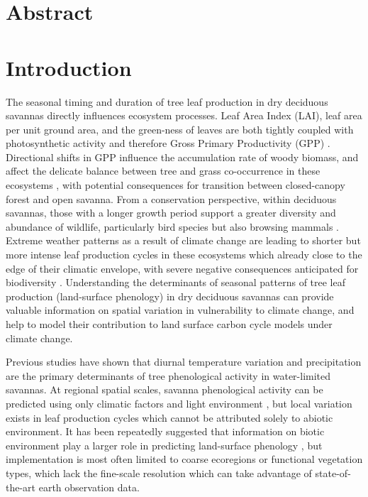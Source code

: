 \documentclass[11pt,a4paper]{article}
\begin{document}
\section*{Abstract}

\section{Introduction}

The seasonal timing and duration of tree leaf production in dry deciduous
savannas directly influences ecosystem processes. Leaf Area Index (LAI), leaf
area per unit ground area, and the green-ness of leaves are both tightly
coupled with photosynthetic activity and therefore Gross Primary Productivity
(GPP) \citep{Gu2003, Penuelas2009}. Directional shifts in GPP influence the
accumulation rate of woody biomass, and affect the delicate balance between
tree and grass co-occurrence in these ecosystems \citep{Stevens2016}, with
potential consequences for transition between closed-canopy forest and open
savanna. From a conservation perspective, within deciduous savannas, those with
a longer growth period support a greater diversity and abundance of wildlife,
particularly bird species but also browsing mammals \citep{Cole2015, Araujo2017,
Morellato2016, Ogutu2013}. Extreme weather patterns as a result of climate
change are leading to shorter but more intense leaf production cycles in these
ecosystems which already close to the edge of their climatic envelope, with severe negative consequences anticipated for biodiversity \citep{Bale2002}. Understanding the determinants of seasonal patterns of tree leaf production (land-surface phenology) in dry deciduous savannas can provide valuable information on spatial variation in vulnerability to climate change, and help to model their contribution to land surface carbon cycle models under climate change.

Previous studies have shown that diurnal temperature variation and precipitation are the primary determinants of tree phenological activity in water-limited savannas. At regional spatial scales, savanna phenological activity can be predicted using only climatic factors and light environment \citep{Adole2018a}, but local variation exists in leaf production cycles which cannot be attributed solely to abiotic environment. It has been repeatedly suggested that information on biotic environment play a larger role in predicting land-surface phenology \citep{Adole2018b, Jeganathan2014, Fuller1999}, but implementation is most often limited to coarse ecoregions or functional vegetation types, which lack the fine-scale resolution which can take advantage of state-of-the-art earth observation data. 
\end{document}
